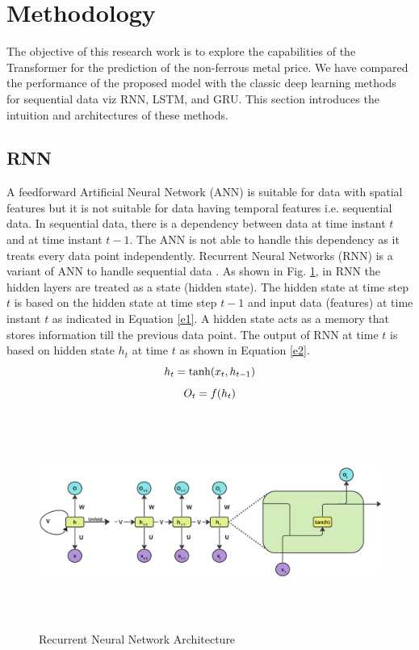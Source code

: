 \documentclass[preprint,12pt]{elsarticle}
\begin{document}
\section{Methodology}
The objective of this research work is to explore the capabilities of the Transformer for the prediction of the non-ferrous metal price. We have compared the performance of the proposed model with the classic deep learning methods for sequential data viz RNN, LSTM, and GRU. This section introduces the intuition and architectures of these methods.
\subsection{RNN}
A feedforward Artificial Neural Network (ANN) is suitable for data with spatial features but it is not suitable for data having temporal features i.e. sequential data. In sequential data, there is a dependency between data at time instant $t$ and at time instant $t-1$. The ANN is not able to handle this dependency as it treats every data point independently. Recurrent Neural Networks (RNN) is a variant of ANN to handle sequential data \cite{rumelhart1986learning}. As shown in Fig. \ref{figrnn1}, in RNN the hidden layers are treated as a state (hidden state). The hidden state at time step $t$ is based on the hidden state at time step $t-1$ and input data (features) at time instant $t$ as indicated in Equation \ref{e1}. A hidden state acts as a memory that stores information till the previous data point. The output of RNN at time $t$ is based on hidden state $h_t$ at time $t$ as shown in Equation \ref{e2}.
\begin{equation} \label{e1}
	h_t = \tanh(x_{t},h_{t-1})\\
\end{equation}
\begin{equation}  \label{e2}
	O_t = f(h_{t})\\
\end{equation}

\begin{center}
	\begin{figure}[!htbp]
		\centering
		\includegraphics[width=15cm, height=7cm]{RNN.jpg}
		\caption{Recurrent Neural Network Architecture}
		\label{figrnn1}
	\end{figure}
\end{center}
\end{document}
